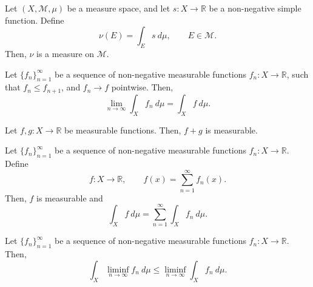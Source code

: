 \documentclass[11pt]{article}
\newcommand{\R}{\mathbb{R}}
\newcommand{\M}{\mathcal{M}}
\theoremstyle{definition}
\theoremstyle{remark}
\numberwithin{equation}{section}
\begin{document}
    \begin{lemma}
        Let $(X, \M, \mu)$ be a measure space, and let $s\colon X \to \R$ be a
        non-negative simple function. Define \[
            \nu(E) = \int_E s\:d\mu, \qquad E \in \M.
        \] Then, $\nu$ is a measure on $\M$.
    \end{lemma}


    \begin{theorem}
        Let $\{f_n\}_{n = 1}^\infty$ be a sequence of non-negative measurable
        functions $f_n\colon X \to \R$, such that $f_n \leq f_{n + 1}$, and $f_n \to
        f$ pointwise. Then, \[
            \lim_{n \to \infty} \int_X f_n\:d\mu = \int_X f\:d\mu.
        \] 
    \end{theorem}

    \begin{lemma}
        Let $f,g\colon X \to \R$ be measurable functions. Then, $f + g$ is measurable.
    \end{lemma}

    \begin{theorem}
        Let $\{f_n\}_{n = 1}^\infty$ be a sequence of non-negative measurable
        functions $f_n\colon X \to \R$. Define \[
            f\colon X \to \R, \qquad f(x) = \sum_{n = 1}^\infty f_n(x).
        \] Then, $f$ is measurable and \[
            \int_X f\:d\mu = \sum_{n = 1}^\infty \int_X f_n\:d\mu.
        \] 
    \end{theorem}

    \begin{theorem}[Fatou]
        Let $\{f_n\}_{n = 1}^\infty$ be a sequence of non-negative measurable
        functions $f_n\colon X \to \R$. Then, \[
            \int_X \liminf_{n \to \infty} f_n\:d\mu \leq \liminf_{n\to \infty} \int_X
            f_n\:d\mu.
        \] 
    \end{theorem}
\end{document}
